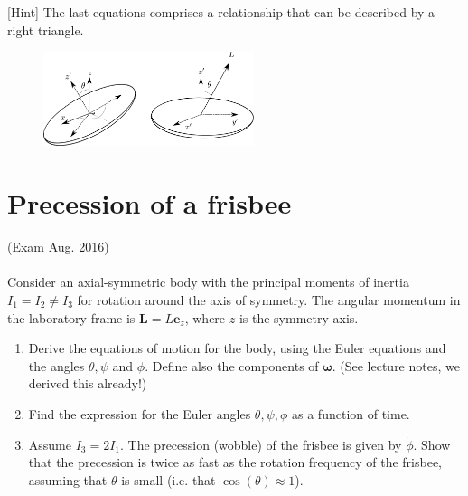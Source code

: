 \documentclass{article}
\begin{document}
    [Hint] The last equations comprises a relationship that can be described by a right triangle.
    \newpage
    \begin{figure}
        \includegraphics[width=0.55\textwidth]{figures/exercise_2_frisbee.pdf}
        \vspace{-2cm}
    \end{figure}\leavevmode %
    \section{Precession of a frisbee}

    (Exam Aug. 2016) \\ \\
    Consider an axial-symmetric body with the principal moments of inertia $I_1 = I_2 \neq I_3$ for rotation around the axis of symmetry. The angular momentum in the laboratory frame is $\mathbf{L} = L \mathbf{e}_z$, where $z$ is the symmetry axis. 
    \begin{enumerate}[label=(\alph*)]
        \item Derive the equations of motion for the body, using the Euler equations and the angles $\theta, \psi$ and $\phi$. Define also the components of $\boldsymbol{\omega}$. (See lecture notes, we derived this already!)
        \item Find the expression for the Euler angles $\theta, \psi, \phi$ as a function of time.
        \item Assume $I_3 = 2I_1$. The precession (wobble) of the frisbee is given by $\dot \phi$. Show that the precession is twice as fast as the rotation frequency of the frisbee, assuming that $\theta$ is small (i.e. that $\cos(\theta) \approx 1$).
    \end{enumerate}
\end{document}
